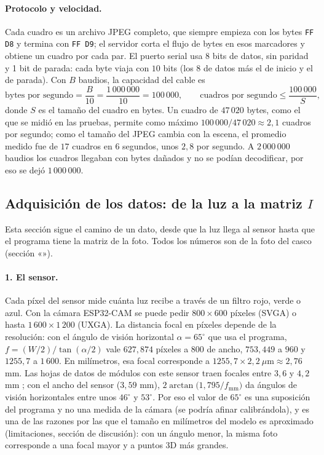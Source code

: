 \paragraph{Protocolo y velocidad.} Cada cuadro es un archivo JPEG completo, que
siempre empieza con los bytes \texttt{FF D8} y termina con \texttt{FF D9}; el
servidor corta el flujo de bytes en esos marcadores y obtiene un cuadro por
cada par. El puerto serial usa 8 bits de datos, sin paridad y 1 bit de parada:
cada byte viaja con $10$ bits (los 8 de datos más el de inicio y el de parada).
Con $B$ baudios, la capacidad del cable es
\begin{equation}
\text{bytes por segundo} = \frac{B}{10} = \frac{1\,000\,000}{10} = 100\,000,
\qquad
\text{cuadros por segundo} \le \frac{100\,000}{S},
\end{equation}
donde $S$ es el tamaño del cuadro en bytes. Un cuadro de $47\,020$ bytes, como
el que se midió en las pruebas, permite como máximo $100\,000/47\,020\approx2{,}1$
cuadros por segundo; como el tamaño del JPEG cambia con la escena, el promedio
medido fue de $17$ cuadros en $6$ segundos, unos $2{,}8$ por segundo. A
$2\,000\,000$ baudios los cuadros llegaban con bytes dañados y no se podían decodificar,
por eso se dejó $1\,000\,000$.

\subsection{Adquisición de los datos: de la luz a la matriz $I$}\label{sec:adquisicion}

Esta sección sigue el camino de un dato, desde que la luz llega al sensor hasta
que el programa tiene la matriz de la foto. Todos los números son de la foto del
casco (sección «»).

\paragraph{1. El sensor.} Cada píxel del sensor mide cuánta luz recibe a través
de un filtro rojo, verde o azul. Con la cámara ESP32-CAM se puede pedir $800\times600$
píxeles (SVGA) o hasta $1\,600\times1\,200$ (UXGA). La distancia focal en píxeles
depende de la resolución: con el ángulo de visión horizontal $\alpha=65^\circ$
que usa el programa, $f=(W/2)/\tan(\alpha/2)$ vale $627{,}874$ píxeles a $800$ de ancho,
$753{,}449$ a $960$ y $1255{,}7$ a $1\,600$. En milímetros, esa focal corresponde a
$1255{,}7\times2{,}2\ \mu\text{m}\approx2{,}76$ mm. Las hojas de datos de módulos con este
sensor traen focales entre $3{,}6$ y $4{,}2$ mm \citep{microchip,arducam}; con el ancho del sensor
($3{,}59$ mm), $2\arctan\bigl(1{,}795/f_{\text{mm}}\bigr)$ da ángulos de visión horizontales entre unos $46^\circ$ y $53^\circ$.
Por eso el valor de $65^\circ$ es una suposición del programa y no una medida de la cámara (se podría
afinar calibrándola), y es una de las razones por las que el tamaño en milímetros del modelo es aproximado
(limitaciones, sección de discusión): con un ángulo menor, la misma foto corresponde a una focal mayor y a puntos 3D más grandes.

